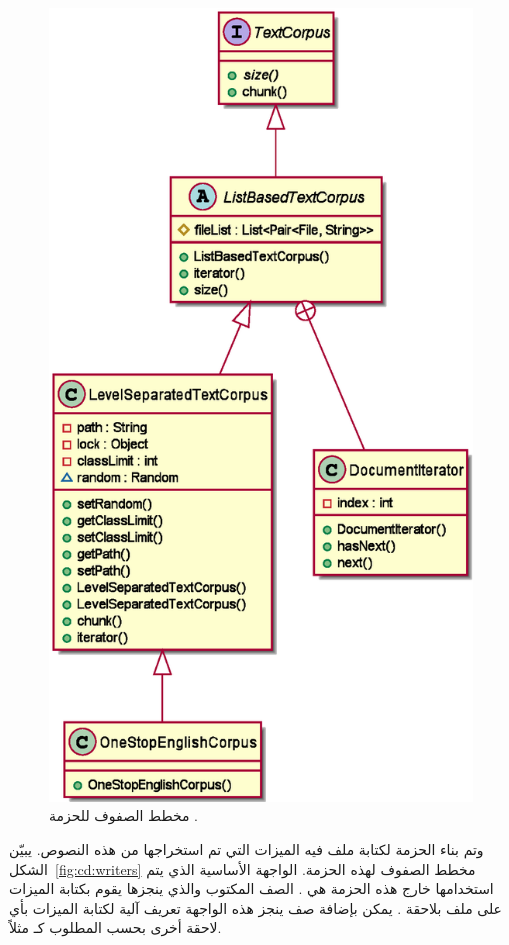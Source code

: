 \begin{figure}[htb]
	\centering
	\includegraphics[width=0.6\linewidth]{images/cd-corpora.eps}
	\caption{%
		مخطط الصفوف للحزمة .
	}
	\label{fig:cd:corpora}
\end{figure}

وتم بناء الحزمة  لكتابة ملف فيه الميزات التي تم استخراجها من هذه النصوص.
يبيّن الشكل~\ref{fig:cd:writers} مخطط الصفوف لهذه الحزمة.
الواجهة الأساسية الذي يتم استخدامها خارج هذه الحزمة هي .
الصف المكتوب والذي ينجزها يقوم بكتابة الميزات على ملف بلاحقة .
يمكن بإضافة صف ينجز هذه الواجهة تعريف آلية لكتابة الميزات بأي لاحقة أخرى بحسب المطلوب كـ  مثلاً.


